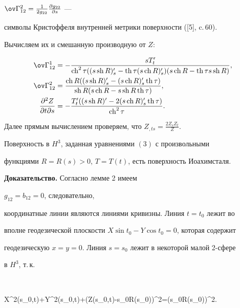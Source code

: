 \begin{pf}
$\ov \Gamma^2_{12}=\frac{1}{2g_{22}}\frac{\partial g_{22}}{\partial s}$ ---


символы Кристоффеля внутренней метрики поверхности ([5], c.\,60).


Вычисляем их и смешанную производную от $Z$:


\begin{align*}


\ov \Gamma^1_{12}&=-\frac{sT'_t}{\ch^2\tau ((s\sh R)'_s-


\th \tau (s\ch R)'_s)(s\ch R-\th \tau s\sh R)},\\


\ov \Gamma^2_{12}&=\frac{\ch R((s\sh R)'_s-(s\ch R)'_s \th \tau)}


{\sh R(s\ch R-s\sh R\th \tau)},\\


\frac{\partial^2Z}{\partial t\partial s}&=


- \frac{T'_t((s\sh R)'-2(s\ch R)'_s\th \tau )}{\ch^2\tau}.


\end{align*}


Далее прямым вычислением проверяем, что $Z_{,ts}=\frac{2Z_sZ_t}{Z}$.


\end{pf}





\begin{thm}


Поверхность в $H^3$, заданная уравнениями $(3)$ с произвольными


функциями $R=R(s)>0$, $T=T(t)$, есть поверхность Иоахимсталя.


\end{thm}





{\bf Доказательство.} Согласно лемме 2 имеем


$g_{12}=b_{12}=0$, следовательно,


координатные линии являются линиями кривизны. Линия $t=t_0$ лежит во


вполне геодезической плоскости $X\sin t_0-Y\cos t_0=0$, которая содержит


геодезическую $x=y=0$. Линия $s=s_0$ лежит в некоторой малой 2-сфере


в $H^3$, т.\,к.


$$


X^2(s_0,t)+Y^2(s_0,t)+(Z(s_0,t)-s_0\ch R(s_0))^2=(s_0\sh R(s_0))^2.


